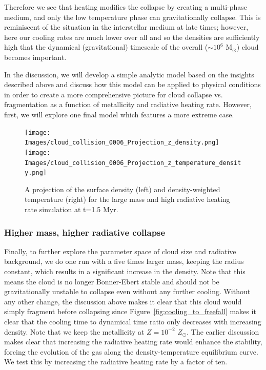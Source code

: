 \documentclass[useAMS,usenatbib]{mn2e}
\newcommand{\msun}{{M$_\odot$}}
\begin{document}
Therefore we see that heating modifies the collapse by creating a multi-phase medium, and only the low temperature phase can gravitationally collapse.  This is reminiscent of the situation in the interstellar medium at late times; however, here our cooling rates are much lower over all and so the densities are sufficiently high that the dynamical (gravitational) timescale of the overall ($\sim 10^6$ \msun) cloud becomes important.   

In the discussion, we will develop a simple analytic model based on the insights described above and discuss how this model can be applied to physical conditions in order to create a more comprehensive picture for cloud collapse vs. fragmentation as a function of metallicity and radiative heating rate.  However, first, we will explore one final model which features a more extreme case.

\begin{figure}
\begin{center}
\texttt{[image: Images/cloud\_collision\_0006\_Projection\_z\_density.png]}
\texttt{[image: Images/cloud\_collision\_0006\_Projection\_z\_temperature\_density.png]}
\end{center}
\caption{\label{fig:big_projections} A projection of the surface density (left) and density-weighted temperature (right)
for the large mass and high radiative heating rate simulation at t=1.5 Myr.}
\end{figure}

\subsubsection{Higher mass, higher radiative collapse}

Finally, to further explore the parameter space of cloud size and radiative background, we do one run with a five times larger mass,
keeping the radius constant, which results in a significant increase in the density.  Note that this means the cloud is no longer Bonner-Ebert
stable and should not be gravitationally unstable to collapse even without any further cooling.  Without any other change, the discussion above
makes it clear that this cloud would simply fragment before collapsing since Figure~\ref{fig:cooling_to_freefall} makes it clear that the cooling
time to dynamical time ratio only decreases with increasing density.  Note that we keep the metallicity at $Z=10^{-2}$ $Z_{\odot}$. The earlier
discussion makes clear that increasing the radiative heating rate would enhance the stability, forcing the evolution of the gas along the
density-temperature equilibrium curve. We test this by increasing the radiative heating rate by a factor of ten.
\end{document}
